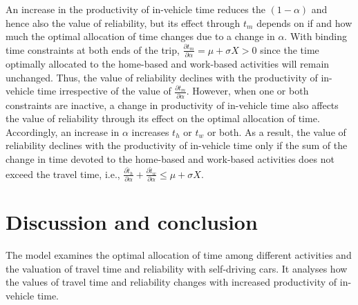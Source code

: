 \documentclass[12pt,a4paper,british]{article}
\begin{document}
An increase in the productivity of in-vehicle time reduces the $\left(1-\alpha\right)$ and hence also the value of reliability, but its effect through $t_{m}$ depends on if and how much the optimal allocation of time changes due to a change in $\alpha$. With binding time constraints at both ends of the trip, $\frac{\partial t_{m}}{\partial\alpha}=\mu+\sigma X>0$ since the time optimally allocated to the home-based and work-based activities will remain unchanged. Thus, the value of reliability declines with the productivity of in-vehicle time irrespective of the value of $\frac{\partial t_{m}}{\partial\alpha}$. However, when one or both constraints are inactive, a change in productivity of in-vehicle time also affects the value of reliability through its effect on the optimal allocation of time. Accordingly, an increase in $\alpha$ increases $t_{h}$ or $t_{w}$ or both. As a result, the value of reliability declines with the productivity of in-vehicle time only if the sum of the change in time devoted to the home-based and work-based activities does not exceed the travel time, i.e., $\frac{\partial\hat{t}_{h}}{\partial\alpha}+\frac{\partial\hat{t}_{w}}{\partial\alpha}\leq\mu+\sigma X$.


\section{Discussion and conclusion}

The model examines the optimal allocation of time among different activities and the valuation of travel time and reliability with self-driving cars. It analyses how the values of travel time and reliability changes with increased productivity of in-vehicle time.

\clearpage

% 


\end{document}
